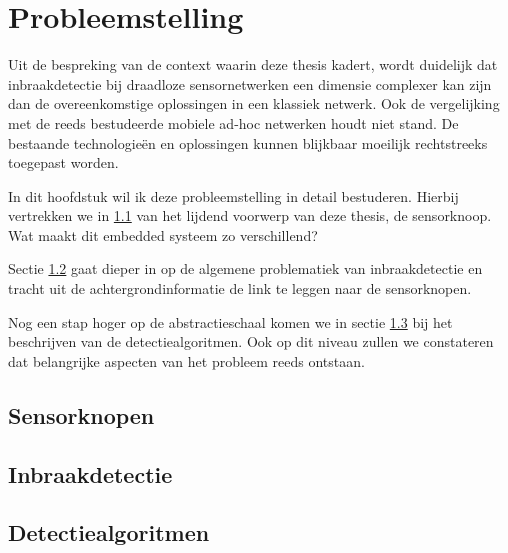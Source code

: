 
\chapter{Probleemstelling}
\label{chapter:probleemstelling}

Uit de bespreking van de context waarin deze thesis kadert, wordt duidelijk dat
inbraakdetectie bij draadloze sensornetwerken een dimensie complexer kan zijn
dan de overeenkomstige oplossingen in een klassiek netwerk. Ook de vergelijking
met de reeds bestudeerde mobiele ad-hoc netwerken houdt niet stand. De
bestaande technologie\"en en oplossingen kunnen blijkbaar moeilijk rechtstreeks
toegepast worden.

In dit hoofdstuk wil ik deze probleemstelling in detail bestuderen. Hierbij
vertrekken we in \ref{section:motes} van het lijdend voorwerp van deze thesis,
de sensorknoop. Wat maakt dit embedded systeem zo verschillend?

Sectie \ref{section:ids} gaat dieper in op de algemene problematiek van
inbraakdetectie en tracht uit de achtergrondinformatie de link te leggen naar
de sensorknopen.

Nog een stap hoger op de abstractieschaal komen we in sectie
\ref{section:algorithms} bij het beschrijven van de detectiealgoritmen. Ook op
dit niveau zullen we constateren dat belangrijke aspecten van het probleem
reeds ontstaan.

\section{Sensorknopen}
\label{section:motes}

\TODO

\section{Inbraakdetectie}
\label{section:ids}

\TODO

\section{Detectiealgoritmen}
\label{section:algorithms}

\TODO
